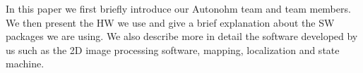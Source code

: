 In this paper we first briefly introduce our Autonohm  team and team members. We then present the HW we use and give a brief explanation about the SW packages we are using. We also describe more in detail the software developed by us such as the 2D image processing software, mapping, localization and state machine. 